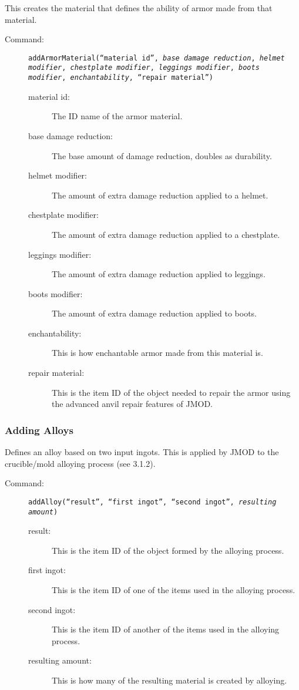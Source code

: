 \documentclass[letterpaper,titlepage,12pt]{article}
\begin{document}
This creates the material that defines the ability of armor made from that material.

\begin{description}
\item[Command:] \texttt{addArmorMaterial(``\emph{material id}'', \emph{base damage reduction}, \emph{helmet modifier}, \emph{chestplate modifier}, \emph{leggings modifier}, \emph{boots modifier}, \emph{enchantability}, ``\emph{repair material}'')}


\begin{description}
\item [material id:] The ID name of the armor material.
\item [base damage reduction:] The base amount of damage reduction, doubles as durability.
\item [helmet modifier:] The amount of extra damage reduction applied to a helmet.
\item [chestplate modifier:] The amount of extra damage reduction applied to a chestplate.
\item [leggings modifier:] The amount of extra damage reduction applied to leggings.
\item [boots modifier:] The amount of extra damage reduction applied to boots.
\item [enchantability:] This is how enchantable armor made from this material is.
\item [repair material:] This is the item ID of the object needed to repair the armor using the advanced anvil repair features of JMOD.
\end{description}
\end{description}

\subsubsection{Adding Alloys}

Defines an alloy based on two input ingots.  This is applied by JMOD to the crucible/mold alloying process (see 3.1.2).

\begin{description}
\item[Command:] \texttt{addAlloy(``\emph{result}'', ``\emph{first ingot}'', ``\emph{second ingot}'', \emph{resulting amount})}

\begin{description}
\item [result:] This is the item ID of the object formed by the alloying process.
\item [first ingot:] This is the item ID of one of the items used in the alloying process.
\item [second ingot:] This is the item ID of another of the items used in the alloying process.
\item [resulting amount:] This is how many of the resulting material is created by alloying.
\end{description}
\end{description}
\end{document}
